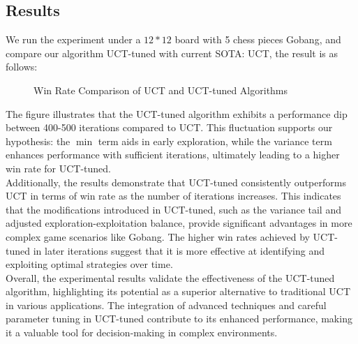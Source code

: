 \documentclass[11pt]{article}
\theoremstyle{definitionstyle}
\begin{document}
\subsection{Results}
We run the experiment under a  $12*12$ board with 5 chess pieces Gobang, and compare our algorithm UCT-tuned with current SOTA: UCT, the result is as follows:
\begin{figure}[H]
    \centering
    \caption{Win Rate Comparison of UCT and UCT-tuned Algorithms}
    \label{fig:algorithm_comparison}
\end{figure}
The figure illustrates that the UCT-tuned algorithm exhibits a performance dip between 400-500 iterations compared to UCT. This fluctuation supports our hypothesis: the $\min$ term aids in early exploration, while the variance term enhances performance with sufficient iterations, ultimately leading to a higher win rate for UCT-tuned.\\
Additionally, the results demonstrate that UCT-tuned consistently outperforms UCT in terms of win rate as the number of iterations increases. This indicates that the modifications introduced in UCT-tuned, such as the variance tail and adjusted exploration-exploitation balance, provide significant advantages in more complex game scenarios like Gobang. The higher win rates achieved by UCT-tuned in later iterations suggest that it is more effective at identifying and exploiting optimal strategies over time.\\
Overall, the experimental results validate the effectiveness of the UCT-tuned algorithm, highlighting its potential as a superior alternative to traditional UCT in various applications. The integration of advanced techniques and careful parameter tuning in UCT-tuned contribute to its enhanced performance, making it a valuable tool for decision-making in complex environments.
\end{document}
